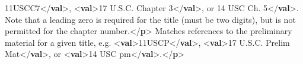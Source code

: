 \begin{shaded}
\hspace*{1em}11USCC7{</\textbf{val}>}, {<\textbf{val}>}17 U.S.C. Chapter 3{</\textbf{val}>}, or\mbox{}\newline 
\hspace*{1em}14 USC Ch. 5{</\textbf{val}>}. Note that a leading zero is\mbox{}\newline 
\hspace*{1em}\hspace*{1em}\hspace*{1em}\hspace*{1em} required for the title (must be two digits), but is not\mbox{}\newline 
\hspace*{1em}\hspace*{1em}\hspace*{1em}\hspace*{1em} permitted for the chapter number.{</\textbf{p}>}\mbox{}\newline 
{}\mbox{}\newline 
{}\mbox{}\newline 
\hspace*{1em}Matches references to the preliminary material for a\mbox{}\newline 
\hspace*{1em}\hspace*{1em}\hspace*{1em}\hspace*{1em} given title, e.g. {<\textbf{val}>}11USCP{</\textbf{val}>}, {<\textbf{val}>}17 U.S.C.\mbox{}\newline 
\hspace*{1em}\hspace*{1em}\hspace*{1em}\hspace*{1em}\hspace*{1em}\hspace*{1em} Prelim Mat{</\textbf{val}>}, or {<\textbf{val}>}14 USC pm{</\textbf{val}>}.{</\textbf{p}>}\mbox{}\newline 

\end{shaded}

